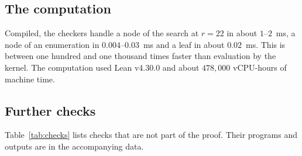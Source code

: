 \documentclass[11pt]{amsart}
\theoremstyle{definition}
\theoremstyle{remark}
\numberwithin{equation}{section}
\begin{document}
\subsection{The computation}
Compiled, the checkers handle a node of the search at $r=22$ in about $1$--$2$~ms, a node of an enumeration in $0.004$--$0.03$~ms and a leaf in about $0.02$~ms. This is between one hundred and one thousand times faster than evaluation by the kernel. The computation used Lean v4.30.0 and about $478{,}000$ vCPU-hours of machine time.

\subsection{Further checks}
Table~\ref{tab:checks} lists checks that are not part of the proof. Their programs and outputs are in the accompanying data.
\end{document}
